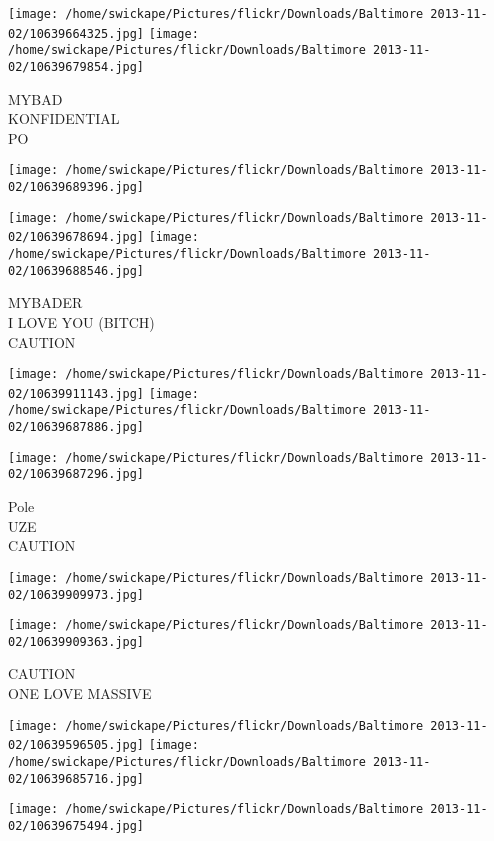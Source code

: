 \documentclass[10pt,letterpaper]{article}
\begin{document}
\vspace{0.25in}
\texttt{[image: /home/swickape/Pictures/flickr/Downloads/Baltimore 2013-11-02/10639664325.jpg]}
\texttt{[image: /home/swickape/Pictures/flickr/Downloads/Baltimore 2013-11-02/10639679854.jpg]}

MYBAD\\
KONFIDENTIAL\\
PO
\pagebreak

\texttt{[image: /home/swickape/Pictures/flickr/Downloads/Baltimore 2013-11-02/10639689396.jpg]}

\vspace{0.25in}
\texttt{[image: /home/swickape/Pictures/flickr/Downloads/Baltimore 2013-11-02/10639678694.jpg]}
\texttt{[image: /home/swickape/Pictures/flickr/Downloads/Baltimore 2013-11-02/10639688546.jpg]}

MYBADER\\
I LOVE YOU (BITCH)\\
CAUTION
\pagebreak

\texttt{[image: /home/swickape/Pictures/flickr/Downloads/Baltimore 2013-11-02/10639911143.jpg]}
\texttt{[image: /home/swickape/Pictures/flickr/Downloads/Baltimore 2013-11-02/10639687886.jpg]}

\vspace{0.25in}
\texttt{[image: /home/swickape/Pictures/flickr/Downloads/Baltimore 2013-11-02/10639687296.jpg]}

Pole\\
UZE\\
CAUTION
\pagebreak

\texttt{[image: /home/swickape/Pictures/flickr/Downloads/Baltimore 2013-11-02/10639909973.jpg]}

\vspace{0.25in}
\texttt{[image: /home/swickape/Pictures/flickr/Downloads/Baltimore 2013-11-02/10639909363.jpg]}

CAUTION\\
ONE LOVE MASSIVE
\pagebreak

\texttt{[image: /home/swickape/Pictures/flickr/Downloads/Baltimore 2013-11-02/10639596505.jpg]}
\texttt{[image: /home/swickape/Pictures/flickr/Downloads/Baltimore 2013-11-02/10639685716.jpg]}

\vspace{0.25in}
\texttt{[image: /home/swickape/Pictures/flickr/Downloads/Baltimore 2013-11-02/10639675494.jpg]}
\end{document}
